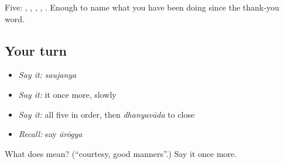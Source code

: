 \begin{grammarlens}[title={What you've built}]
Five: , , , , . Enough to name what you have been doing since the thank-you word.
\end{grammarlens}

\subsection*{Your turn}
\begin{itemize}
\raggedright
  \item \emph{Say it:} \emph{saujanya}
  \item \emph{Say it:} it once more, slowly
  \item \emph{Say it:} all five in order, then \emph{dhanyavāda} to close
  \item \emph{Recall:} say \emph{ārōgya}
\end{itemize}

\begin{tcolorbox}[breakable,colback=teal!4,colframe=teal!35!black,title={Before you move on}]
What does  mean? (\textquotedblleft{}courtesy, good manners\textquotedblright{}.) Say it once more.
\end{tcolorbox}
